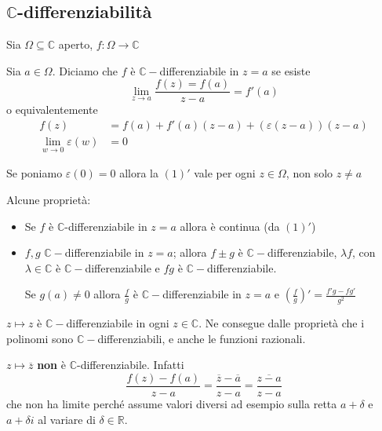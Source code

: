 \subsection{\(\mathbb{C}\)-differenziabilità}
Sia \(\Omega \subseteq \mathbb{C}\) aperto, \(f : \Omega \to \mathbb{C}\) 
\begin{definition}
    Sia \(a \in \Omega\). Diciamo che \(f\)  è \(\mathbb{C}-\)differenziabile in
    \(z=a\) se esiste
    \begin{equation}
        \lim_{z \to a} \frac{f(z) = f(a)}{z - a} = f'(a)
    \end{equation}
    o equivalentemente
    \begin{align}
        f(z) &= f(a) + f'(a) (z-a) + (\varepsilon(z-a))(z-a) \\
        \lim_{w \to 0} \varepsilon(w) &= 0
    \end{align}
\end{definition}
Se poniamo \(\varepsilon(0) = 0\) allora la \((1)'\) vale per ogni \(z \in
\Omega\), non solo \(z\neq a\) 

Alcune proprietà:
\begin{itemize}[label = --]
    \item Se \(f\) è \(\mathbb{C}\)-differenziabile in \(z = a\) allora è
        continua (da \((1)'\))
    \item \(f, g\) \(\mathbb{C}-\)differenziabile in \(z=a\); allora \(f \pm g\)
        è \(\mathbb{C}-\)differenziabile, \(\lambda f\), con \(\lambda \in
        \mathbb{C}\) è \(\mathbb{C}-\)differenziabile e \(fg\) è
        \(\mathbb{C}-\)differenziabile.

        Se \(g(a) \neq 0\) allora \(\frac{f}{g}\) è
        \(\mathbb{C}-\)differenziabile in \(z=a\) e \({\left( \frac{f}{g}
        \right)}' = \frac{f'g -
        fg'}{g^2}\) 
\end{itemize}
\begin{example}
    \(z \mapsto z\) è \(\mathbb{C}-\)differenziabile in ogni \(z \in
    \mathbb{C}\). Ne consegue dalle proprietà che i polinomi sono
    \(\mathbb{C}-\)differenziabili, e anche le funzioni razionali.
\end{example}
\begin{example}
    \(z \mapsto \overline{z}\) \textbf{non} è \(\mathbb{C}\)-differenziabile.
    Infatti
    \[
        \frac{f(z) - f(a)}{z-a} = \frac{\overline{z} - \overline{a} }{z-a} =
        \frac{\overline{z-a}}{z-a}
    \]
    che non ha limite perché assume valori diversi ad esempio sulla retta \(a +
    \delta \) e \(a + \delta i\) al variare di \(\delta \in \mathbb{R}\).
\end{example}

